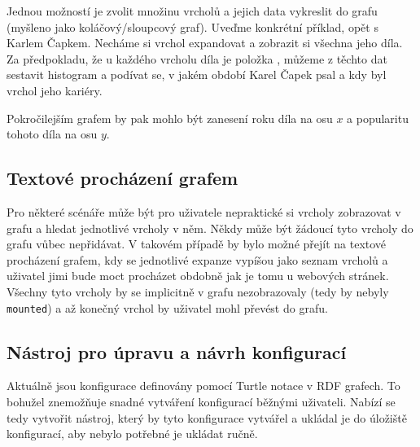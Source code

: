 Jednou možností je zvolit množinu vrcholů a jejich data vykreslit do grafu (myšleno jako koláčový/sloupcový graf). Uveďme konkrétní příklad, opět s Karlem Čapkem. Necháme si vrchol expandovat a zobrazit si všechna jeho díla. Za předpokladu, že u každého vrcholu díla je položka , můžeme z těchto dat sestavit histogram a podívat se, v jakém období Karel Čapek psal a kdy byl vrchol jeho kariéry.

Pokročilejším grafem by pak mohlo být zanesení roku díla na osu $x$ a popularitu tohoto díla na osu $y$.

\subsection*{Textové procházení grafem}
Pro některé scénáře může být pro uživatele nepraktické si vrcholy zobrazovat v grafu a hledat jednotlivé vrcholy v něm. Někdy může být žádoucí tyto vrcholy do grafu vůbec nepřidávat. V takovém případě by bylo možné přejít na textové procházení grafem, kdy se jednotlivé expanze vypíšou jako seznam vrcholů a uživatel jimi bude moct procházet obdobně jak je tomu u webových stránek. Všechny tyto vrcholy by se implicitně v grafu nezobrazovaly (tedy by nebyly \texttt{mounted}) a až konečný vrchol by uživatel mohl převést do grafu.

\subsection*{Nástroj pro úpravu a návrh konfigurací}
Aktuálně jsou konfigurace definovány pomocí Turtle notace v RDF grafech. To bohužel znemožňuje snadné vytváření konfigurací běžnými uživateli. Nabízí se tedy vytvořit nástroj, který by tyto konfigurace vytvářel a ukládal je do úložiště konfigurací, aby nebylo potřebné je ukládat ručně.
